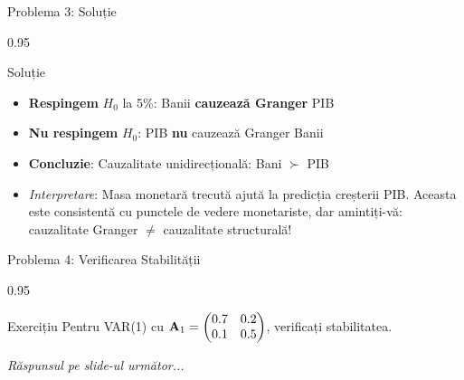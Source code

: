 \documentclass[9pt, aspectratio=169, t]{beamer}
\begin{document}
\begin{frame}{Problema 3: Soluție}
    \begin{cminipage}{0.95\textwidth}
    \begin{exampleblock}{Soluție}
        \begin{itemize}\setlength{\itemsep}{2pt}
            \item \textbf{Respingem} $H_0$ la 5\%: Banii \textbf{cauzează Granger} PIB
            \item \textbf{Nu respingem} $H_0$: PIB \textbf{nu} cauzează Granger Banii
            \item \textbf{Concluzie}: Cauzalitate unidirecțională: Bani $\succ$ PIB
            \item \textit{Interpretare}: Masa monetară trecută ajută la predicția creșterii PIB. Aceasta este consistentă cu punctele de vedere monetariste, dar amintiți-vă: cauzalitate Granger $\neq$ cauzalitate structurală!
        \end{itemize}
    \end{exampleblock}
    \end{cminipage}
\end{frame}

\begin{frame}{Problema 4: Verificarea Stabilității}
    \begin{cminipage}{0.95\textwidth}
    \begin{block}{Exercițiu}
        Pentru VAR(1) cu $\mathbf{A}_1 = \begin{pmatrix} 0.7 & 0.2 \\ 0.1 & 0.5 \end{pmatrix}$, verificați stabilitatea.
    \end{block}

    \vspace{0.5cm}
    \begin{flushright}\textit{Răspunsul pe slide-ul următor...}\end{flushright}
    \end{cminipage}
\end{frame}
\end{document}
